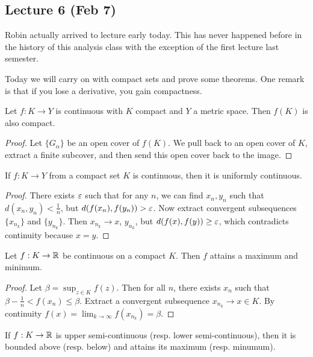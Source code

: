 \documentclass[10pt, twoside]{article}
\begin{document}
    \subsection{Lecture 6 (Feb 7)}
    Robin actually arrived to lecture early today. This has never happened before in the history of this analysis class with the exception of the first lecture last semester.

    Today we will carry on with compact sets and prove some theorems. One remark is that if you lose a derivative, you gain compactness. 

    \begin{thm}
        Let $f : K \rightarrow Y$ is continuous with $K$ compact and $Y$ a metric space. Then $f(K)$ is also compact.
        \begin{proof}
            Let $\{G_{\alpha}\}$ be an open cover of $f(K)$. We pull back to an open cover of $K$, extract a finite subcover, and then send this open cover back to the image.
        \end{proof}
    \end{thm}

    \begin{thm}
        If $f: K \rightarrow Y$ from a compact set $K$ is continuous, then it is uniformly continuous. 
        \begin{proof}
            There exists $\varepsilon$ such that for any $n$, we can find $x_n,y_n$ such that $d(x_n,y_n) < \frac{1}{n}$, but $d(f(x_n), f(y_n)) > \varepsilon$. Now extract convergent subsequences $\{x_{n_k}\}$ and $\{y_{n_k}\}$. Then $x_{n_k} \rightarrow x$, $y_{n_k}$, but $d(f(x), f(y)) \geq \varepsilon$, which contradicts continuity because $x = y$.
        \end{proof}
    \end{thm}

    \begin{thm}
        Let $f: K \rightarrow \mathbb{R}$ be continuous on a compact $K$. Then $f$ attains a maximum and minimum.
        \begin{proof}
            Let $\beta = \sup_{z \in K} f(z)$. Then for all $n$, there exists $x_n$ such that $\beta - \frac{1}{n} < f(x_n) \leq \beta$. Extract a convergent subsequence $x_{n_k} \rightarrow x \in K$. By continuity $f(x) = \lim_{k \rightarrow \infty} f(x_{n_k}) = \beta$.
        \end{proof}
    \end{thm}

    \begin{cor}
        If $f : K \rightarrow \mathbb{R}$ is upper semi-continuous (resp. lower semi-continuous), then it is bounded above (resp. below) and attains its maximum (resp. minumum).
    \end{cor}
\end{document}
